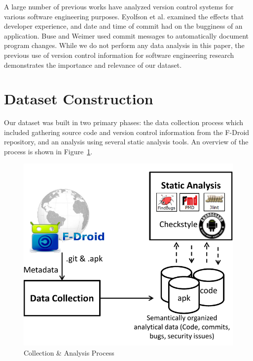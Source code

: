 \documentclass[conference]{IEEEtran}
\begin{document}
A large number of previous works have analyzed version control systems for various software engineering purposes. Eyolfson et al.\cite{Eyolfson:2011:TDD:1985441.1985464} examined the effects that developer experience, and date and time of commit had on the bugginess of an application. Buse and Weimer\cite{Buse:2010:ADP:1858996.1859005} used commit messages to automatically document program changes. While we do not perform any data analysis in this paper, the previous use of version control information for software engineering research demonstrates the importance and relevance of our dataset.



\section{Dataset Construction}
\label{sec: datasetconstruction}


Our dataset was built in two primary phases: the data collection process which included gathering source code and version control information from the F-Droid repository, and an analysis using several static analysis tools. An overview of the process is shown in Figure~\ref{fig:ap}.


\begin{figure}[tbph]
\centering
\vspace{-0.2cm}
\includegraphics[scale=.6]{./images/collectionprocess.pdf}
\caption{Collection \& Analysis Process}
\vspace{-0.2cm}
\label{fig:ap}
\end{figure}
\end{document}
